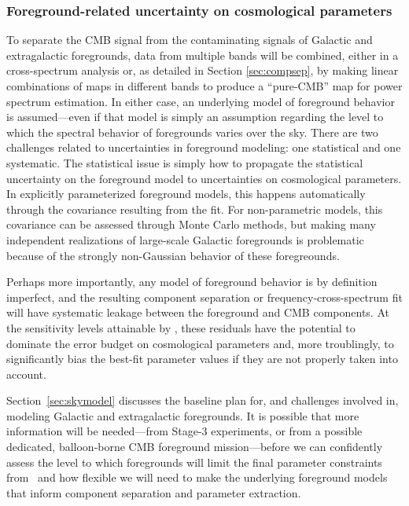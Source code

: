 \subsubsection{Foreground-related uncertainty on cosmological parameters}
\label{se:paramforeg}


To separate the CMB signal from the contaminating signals of Galactic and extragalactic foregrounds, 
data from multiple bands will be combined, either 
in a cross-spectrum analysis or, as detailed in Section \ref{sec:compsep}, by making linear 
combinations of maps in different bands to produce a ``pure-CMB'' map for power spectrum estimation.
In either case, an underlying model of foreground behavior is assumed---even if that model is simply
an assumption regarding the level to which the spectral behavior of foregrounds varies over the sky.
There are two challenges related to uncertainties in foreground modeling: one statistical and one
systematic. The statistical issue is simply how to propagate the statistical uncertainty on the foreground 
model to uncertainties on cosmological parameters. In explicitly parameterized foreground models, 
this happens automatically through the covariance resulting from the fit. For non-parametric models,
this covariance can be assessed through Monte Carlo methods, but making many independent 
realizations of large-scale Galactic foregrounds is problematic because of the strongly non-Gaussian
behavior of these foregreounds.

Perhaps more importantly, 
any model of foreground behavior is by definition imperfect, and the resulting component separation
or frequency-cross-spectrum fit will have systematic leakage between the foreground and CMB components.
At the sensitivity levels attainable by \cmbexp, these residuals have the potential to dominate the
error budget on cosmological parameters and, more troublingly, to significantly bias the best-fit 
parameter values if they are not properly taken into account.

Section~\ref{sec:skymodel} discusses the baseline plan for, and challenges involved in, modeling
Galactic and extragalactic foregrounds. It is possible that more information will be needed---from 
Stage-3 experiments, or from a possible dedicated, balloon-borne CMB foreground mission---before
we can confidently assess the level to which foregrounds will limit the final parameter constraints
from \cmbexp\ and how flexible we will need to make the underlying foreground models that 
inform component separation and parameter extraction. 

